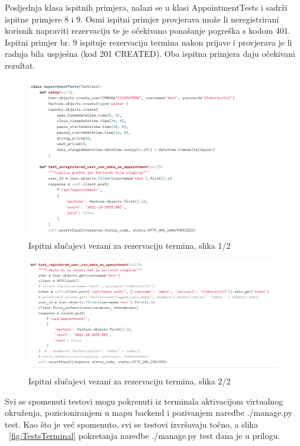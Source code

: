			Posljednja klasa ispitnih primjera, nalazi se u klasi AppointmentTests i sadrži ispitne primjere 8 i 9. Osmi ispitni primjer provjerava može li neregistrirani korisnik napraviti rezervaciju te je očekivano ponašanje pogreška s kodom 401. Ispitni primjer br. 9 ispituje rezervaciju termina nakon prijave i provjerava je li radnja bila uspješna (kod 201 CREATED). Oba ispitna primjera daju očekivani rezultat.
			
			\begin{figure}[H]
				\centering
				\includegraphics[scale=0.65]{slike/AppointmentTests1.PNG}
				\caption{Ispitni slučajevi vezani za rezervaciju termina, slika 1/2}
				\label{fig:promjene}
			\end{figure}
		
			\begin{figure}[H]
				\centering
				\includegraphics[scale=0.65]{slike/AppointmentTests2.PNG}
				\caption{Ispitni slučajevi vezani za rezervaciju termina, slika 2/2}
				\label{fig:promjene}
			\end{figure}
		
			Svi se spomenuti testovi mogu pokrenuti iz terminala aktivacijom virtualnog okruženja, pozicioniranjem u mapu backend i pozivanjem naredbe ./manage.py test. Kao što je već spomenuto, svi se testovi izvršavaju točno, a slika ~\ref{fig:TestsTerminal} pokretanja naredbe ./manage.py test dana je u prilogu. 
			
